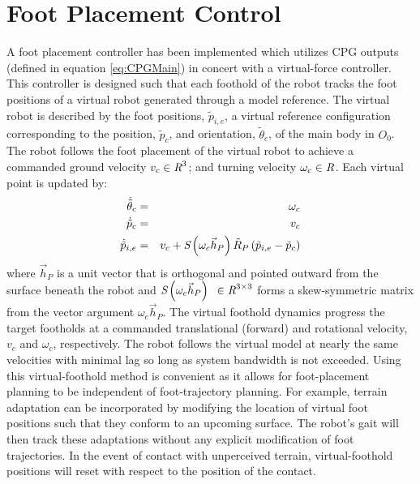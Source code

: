 	\section{Foot Placement Control}


		A foot placement controller has been implemented which utilizes CPG outputs (defined in equation \ref{eq:CPGMain}) in concert with a virtual-force controller. This controller is designed such that each foothold of the robot tracks the foot positions of a virtual robot generated through a model reference. The virtual robot is described by the foot positions, $\tilde{p}_{i,e}$, a virtual reference configuration corresponding to the position, $\tilde{p}_{c}$, and orientation, $\tilde{\theta}_{c}$, of the main body in $O_{0}$. The robot follows the foot placement of the virtual robot to achieve a commanded ground velocity $v_{c} \in\emph{R}^{3} $; and turning velocity $\omega_{c} \in\emph{R}^{}$. Each virtual point is updated by:
		\begin{eqnarray}
			\dot{\tilde{\theta}}_{c}	& = & \omega_{c} 	\nonumber\\
			\dot{\tilde{p}}_{c}			& = & v_{c}			\nonumber\\
			\dot{\tilde{p}}_{i,e} 		& = & v_{c} + \emph{S}\left(\omega_{c}\vec{h}_P\right) \tilde{R}_{P} \left(\tilde{p}_{i,e}-\tilde{p}_{c} \right) 
			\label{eq::virtual_foothold_control}
		\end{eqnarray}
		where $\vec{h}_P$ is a unit vector that is orthogonal and pointed outward from the surface beneath the robot and 
		$\emph{S}\left(\omega_{c}\vec{h}_P\right)\text{ }\in \emph{R}^{3\times3}$ forms a skew-symmetric matrix from the vector argument $\omega_{c}\vec{h}_P$. The virtual foothold dynamics progress the target footholds at a commanded translational (forward) and rotational velocity, $v_{c}$ and $\omega_{c}$, respectively. The robot follows the virtual model at nearly the same velocities with minimal lag so long as system bandwidth is not exceeded. Using this virtual-foothold method is convenient as it allows for foot-placement planning to be independent of foot-trajectory planning. For example, terrain adaptation can be incorporated by modifying the location of virtual foot positions such that they conform to an upcoming surface. The robot's gait will then track these adaptations without any explicit modification of foot trajectories. In the event of contact with unperceived terrain, virtual-foothold positions will reset with respect to the position of the contact.

